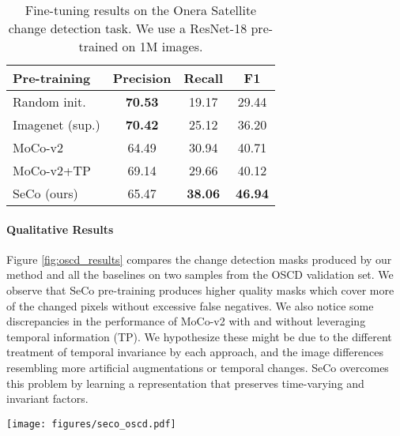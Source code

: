 \documentclass[10pt,twocolumn,letterpaper]{article}
\newcommand{\methodname}[0]{SeCo}
\begin{document}
\begin{table}[t]
    \begin{center}
    \begin{tabular}{l|ccc}
        \toprule
        Pre-training & Precision & Recall & F1 \\
        \hline\hline
        Random init. & \textbf{70.53} & 19.17 & 29.44 \\
        Imagenet (sup.) & \textbf{70.42} & 25.12 & 36.20 \\
        \hline
        MoCo-v2 & 64.49 & 30.94 & 40.71 \\
        MoCo-v2+TP & 69.14 & 29.66 & 40.12 \\
        SeCo (ours) & 65.47 & \textbf{38.06} & \textbf{46.94} \\
        \bottomrule
    \end{tabular}
    \end{center}
    \caption{Fine-tuning results on the Onera Satellite change detection task. We use a ResNet-18 pre-trained on 1M images.}
    \label{tab:oscd_results}
\end{table}

\vspace{-1em}\paragraph{Qualitative Results}
Figure \ref{fig:oscd_results} compares the change detection masks produced by our method and all the baselines on two samples from the OSCD validation set. We observe that \methodname{} pre-training produces higher quality masks which cover more of the changed pixels without excessive false negatives. We also notice some discrepancies in the performance of MoCo-v2 with and without leveraging temporal information (TP). We hypothesize these might be due to the different treatment of temporal invariance by each approach, and the image differences resembling more artificial augmentations or temporal changes. \methodname{} overcomes this problem by learning a representation that preserves time-varying and invariant factors.

\begin{figure*}[t]
    \begin{center}
    \texttt{[image: figures/seco\_oscd.pdf]}
    \end{center}
    \caption{Comparison of qualitative results on the Onera Satellite change detection task. Each row contains the input images, the ground truth mask, and the generated change detection masks for a validation sample.}
    \label{fig:oscd_results}
    \vspace{-0.5em}
\end{figure*}
\end{document}
